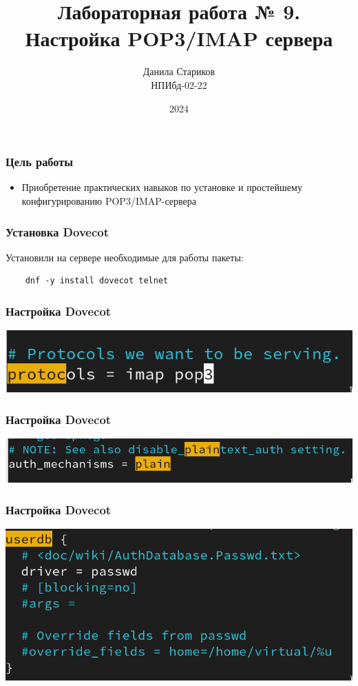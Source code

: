 

\title{Лабораторная работа № 9. \\ Настройка POP3/IMAP сервера}
\author{Данила Стариков \\ НПИбд-02-22}
\date{2024}



\frame{\titlepage}

\begin{frame}
\frametitle{Цель работы}
\begin{itemize}
    \item Приобретение практических навыков по установке и простейшему конфигурированию POP3/IMAP-сервера
\end{itemize}
\end{frame}

\begin{frame}[fragile]
  \frametitle{Установка Dovecot}
Установили на сервере необходимые для работы пакеты:
\begin{verbatim}
    dnf -y install dovecot telnet
\end{verbatim}
\end{frame}

\begin{frame}
\frametitle{Настройка Dovecot}
    \centering
    \includegraphics[width=\textwidth]{../images/image01.png}
\end{frame}

\begin{frame}
\frametitle{Настройка Dovecot}
    \centering
    \includegraphics[width=\textwidth]{../images/image02.png}
\end{frame}

\begin{frame}
\frametitle{Настройка Dovecot}
    \centering
    \includegraphics[width=\textwidth]{../images/image03.png}
\end{frame}

